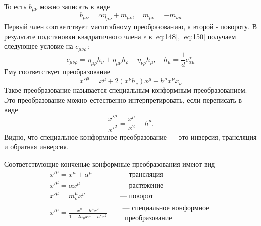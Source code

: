 \documentclass[a4paper,12pt]{article}
\theoremstyle{definition}
\theoremstyle{definition}
\theoremstyle{definition}
\begin{document}
То есть $b_{\mu\nu}$ можно записать в виде
\begin{equation}
  \label{eq:159}
  b_{\mu\nu}=\alpha \eta_{\mu\nu} +m_{\mu\nu},\quad m_{\mu\nu}=-m_{\nu\mu}
\end{equation}
Первый член соответствует масштабному преобразованию, а второй - повороту. 
В результате подстановки квадратичного члена $\epsilon$ в \eqref{eq:148}, \eqref{eq:150} получаем следующее условие на $c_{\mu\nu\rho}$:
\begin{equation}
  \label{eq:160}
  c_{\mu\nu\rho}=\eta_{\mu\rho} h_{\nu} +\eta_{\mu\nu}h_{\rho}-\eta_{\nu\rho}h_{\mu}, \quad h_{\mu}=\frac{1}{d} c^{\alpha}_{\alpha\mu}
\end{equation}
Ему соответствует преобразование
\begin{equation}
  \label{eq:161}
  x'^{\mu}=x^{\mu}+2 (x^{\nu}h_{\nu})x^{\mu} -h^{\mu} x^{\nu}x_{\nu}
\end{equation}
Такое преобразование называется специальным конформным преобразованием.
Это преобразование можно естественно интерпретировать, если переписать в виде
\begin{equation}
  \label{eq:162}
  \frac{x'^{\mu}}{x'^2}=\frac{x^{\mu}}{x^2}-h^{\mu}.
\end{equation}
Видно, что специальное конформное преобразование --- это инверсия, трансляция и обратная инверсия. 

Соответствующие конченые конформные преобразования имеют вид
\begin{eqnarray}
  \label{eq:163}
  x'^{\mu}=x^{\mu}+a^{\mu}&\quad \mbox{--- трансляция}\\
  x'^{\mu}=\alpha x^{\mu} &\quad \mbox{--- растяжение}\\
  x'^{\mu}=m^{\mu}_{\nu} x^{\nu} &\quad \mbox{--- поворот}\\
  x'^{\mu}=\frac{x^{\mu}-h^{\mu}x^2}{1-2h_{\mu}x^{\mu}+h^2 x^2}  & \quad \begin{array}{c}\mbox{--- специальное конформное}\\ \mbox{ преобразование}\end{array}
\end{eqnarray}
\end{document}
